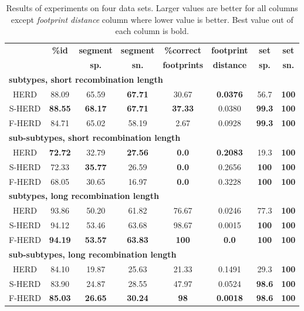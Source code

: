 \begin{table}
\begin{center}
\begin{tabular}{cccccccc}\hline
&{\bf \%id}&\bf segment&\bf segment&\bf \%correct&\bf footprint&\bf set&\bf  set\\ 
&&\bf sp.& \bf sn.& \bf footprints&\bf distance&\bf    sp.&\bf  sn.\\ 
\hline
\hline
\multicolumn{8}{l}{\bf subtypes, short recombination length}\\
HERD   &88.09& 65.59& {\bf 67.71}& 30.67& {\bf 0.0376}& 56.7&{\bf 100}\\
S-HERD &{\bf 88.55}& {\bf 68.17}& {\bf 67.71}& {\bf 37.33}& 0.0380& {\bf 99.3}&{\bf 100}\\
F-HERD &84.71& 65.02& 58.19& 2.67& 0.0928& {\bf 99.3}&{\bf 100}\\\hline
\multicolumn{8}{l}{\bf sub-subtypes, short recombination length}\\
HERD   &{\bf 72.72}& 32.79& {\bf 27.56}& {\bf 0.0}&    {\bf 0.2083}& 19.3&{\bf 100}\\
S-HERD &72.33&{\bf 35.77}& 26.59& {\bf 0.0}&    0.2656& {\bf 100}&{\bf 100}\\
F-HERD &68.05&30.65& 16.97& {\bf 0.0}&    0.3228& {\bf 100}&{\bf 100}\\\hline
\multicolumn{8}{l}{\bf subtypes, long recombination length}\\
HERD   &93.86& 50.20& 61.82& 76.67& 0.0246& 77.3&{\bf 100}\\
S-HERD &94.12& 53.46& 63.68& 98.67& 0.0015&   {\bf 100}&{\bf 100}\\
F-HERD &{\bf 94.19}& {\bf 53.57}& {\bf 63.83}& {\bf 100}&    {\bf 0.0}&
{\bf 100}&{\bf 100}\\\hline
\multicolumn{8}{l}{\bf sub-subtypes, long recombination length}\\
HERD   &84.10& 19.87& 25.63& 21.33& 0.1491& 29.3&{\bf 100}\\
S-HERD &83.90& 24.87& 28.55& 47.97& 0.0524& {\bf 98.6}&{\bf 100}\\
F-HERD &{\bf 85.03}& {\bf 26.65}& {\bf 30.24}& {\bf 98}&   {\bf 0.0018}& {\bf
98.6}&{\bf 100}\\
\end{tabular}
\end{center}
\caption[Results of F/S-HERD on artificial recombinants.]{Results of experiments
on four data sets. Larger values are better for all columns  except
{\it footprint distance} column where lower value is better. Best value out of
each column is bold.}\label{HERD:EXPTABLE}
\end{table}

